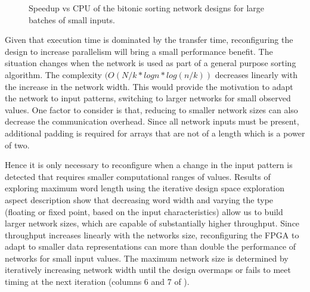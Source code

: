 \begin{figure}[!ht]
  \centering
  \hspace{-1cm}
  \caption{Speedup vs CPU of the bitonic sorting network designs for
    large batches of small inputs.}
  \label{fig:bsort-scalab}
\end{figure}

Given that execution time is dominated by the transfer time,
reconfiguring the design to increase parallelism will bring a small
performance benefit.  The situation changes when the network is used
as part of a general purpose sorting algorithm. The complexity $(
O(N/k * logn * log(n/k)) $ decreases linearly with the increase in the
network width. This would provide the motivation to adapt the network
to input patterns, switching to larger networks for small observed
values. One factor to consider is that, reducing to smaller network
sizes can also decrease the communication overhead. Since all network
inputs must be present, additional padding is required for arrays that
are not of a length which is a power of two.

Hence it is only necessary to reconfigure when a change in the input
pattern is detected that requires smaller computational ranges of
values. Results of exploring maximum word length using the iterative
design space exploration aspect description show that decreasing word
width and varying the type (floating or fixed point, based on the
input characteristics) allow us to build larger network sizes, which
are capable of substantially higher throughput. Since throughput
increases linearly with the networks size, reconfiguring the FPGA to
adapt to smaller data representations can more than double the
performance of networks for small input values. The maximum network
size is determined by iteratively increasing network width until the
design overmaps or fails to meet timing at the next iteration (columns
6 and 7 of ).

